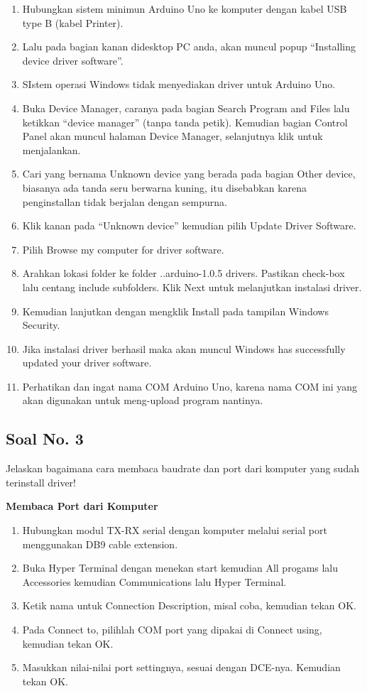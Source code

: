 \begin{enumerate}
	\item Hubungkan sistem minimun Arduino Uno ke komputer dengan kabel USB type B (kabel Printer).
	\item Lalu pada bagian kanan didesktop PC anda, akan muncul popup “Installing device driver software”.
	\item SIstem operasi Windows tidak menyediakan driver untuk Arduino Uno.
	\item Buka Device Manager, caranya pada bagian Search Program and Files lalu ketikkan “device manager” (tanpa tanda petik). Kemudian bagian Control Panel akan muncul halaman Device Manager, selanjutnya klik untuk menjalankan.
	\item Cari yang bernama Unknown device yang berada pada bagian Other device, biasanya ada tanda seru berwarna kuning, itu disebabkan karena penginstallan tidak berjalan dengan sempurna.
	\item Klik kanan pada “Unknown device” kemudian pilih Update Driver Software.
	\item Pilih Browse my computer for driver software.
	\item Arahkan lokasi folder ke folder ..arduino-1.0.5 drivers. Pastikan check-box lalu centang include subfolders. Klik Next untuk melanjutkan instalasi driver.
	\item Kemudian lanjutkan dengan mengklik Install pada tampilan Windows Security.
	\item Jika instalasi driver berhasil maka akan muncul Windows has successfully updated your driver software.
	\item Perhatikan dan ingat nama COM Arduino Uno, karena nama COM ini yang akan digunakan untuk meng-upload program nantinya.
\end{enumerate}

\subsection{Soal No. 3}
Jelaskan bagaimana cara membaca baudrate dan port dari komputer yang sudah terinstall driver!

\hfill \break
\textbf{Membaca Port dari Komputer}

\begin{enumerate}
	\item Hubungkan modul TX-RX serial dengan komputer melalui serial port menggunakan DB9 cable extension.
	\item Buka Hyper Terminal dengan menekan start kemudian All progams lalu Accessories kemudian Communications lalu Hyper Terminal.
	\item Ketik nama untuk Connection Description, misal coba, kemudian tekan OK.
	\item Pada Connect to, pilihlah COM port yang dipakai di Connect using, kemudian tekan OK.
	\item Masukkan nilai-nilai port settingnya, sesuai dengan DCE-nya. Kemudian tekan OK.
\end{enumerate}




